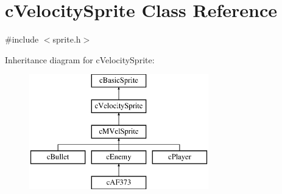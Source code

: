 \hypertarget{classc_velocity_sprite}{\section{c\-Velocity\-Sprite Class Reference}
\label{classc_velocity_sprite}
}


{\ttfamily \#include $<$sprite.\-h$>$}

Inheritance diagram for c\-Velocity\-Sprite\-:\begin{figure}[H]
\begin{center}
\leavevmode
\includegraphics[height=5.000000cm]{classc_velocity_sprite}
\end{center}
\end{figure}
